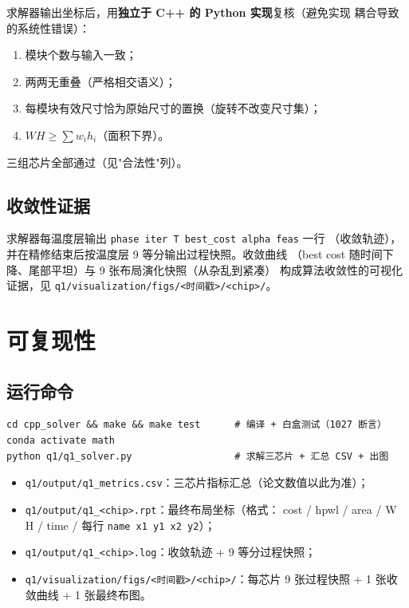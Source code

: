 \documentclass[12pt,a4paper]{article}
\begin{document}
求解器输出坐标后，用\textbf{独立于 C++ 的 Python 实现}复核（避免实现
耦合导致的系统性错误）：
\begin{enumerate}
    \item 模块个数与输入一致；
    \item 两两无重叠（严格相交语义）；
    \item 每模块有效尺寸恰为原始尺寸的置换（旋转不改变尺寸集）；
    \item $WH \ge \sum w_i h_i$（面积下界）。
\end{enumerate}
三组芯片全部通过（见"合法性"列）。

\subsection{收敛性证据}

求解器每温度层输出 \texttt{phase iter T best\_cost alpha feas} 一行
（收敛轨迹），并在精修结束后按温度层 9 等分输出过程快照。收敛曲线
（best cost 随时间下降、尾部平坦）与 9 张布局演化快照（从杂乱到紧凑）
构成算法收敛性的可视化证据，见
\texttt{q1/visualization/figs/<时间戳>/<chip>/}。

\section{可复现性}

\subsection{运行命令}

{\small
\begin{verbatim}
cd cpp_solver && make && make test      # 编译 + 白盒测试（1027 断言）
conda activate math
python q1/q1_solver.py                  # 求解三芯片 + 汇总 CSV + 出图
\end{verbatim}
}

\begin{itemize}
    \item \texttt{q1/output/q1\_metrics.csv}：三芯片指标汇总（论文数值以此为准）；
    \item \texttt{q1/output/q1\_<chip>.rpt}：最终布局坐标（格式：
    cost / hpwl / area / W H / time / 每行 \texttt{name x1 y1 x2 y2}）；
    \item \texttt{q1/output/q1\_<chip>.log}：收敛轨迹 + 9 等分过程快照；
    \item \texttt{q1/visualization/figs/<时间戳>/<chip>/}：每芯片
    9 张过程快照 + 1 张收敛曲线 + 1 张最终布图。
\end{itemize}
\end{document}

